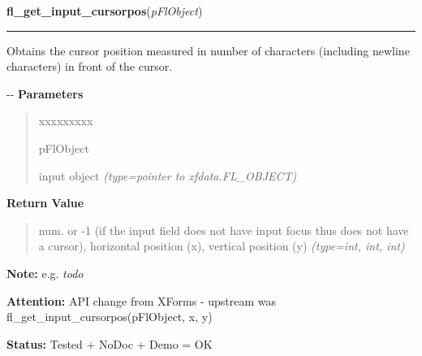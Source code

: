\hspace{.8\funcindent}\begin{boxedminipage}{\funcwidth}

    \raggedright \textbf{fl\_get\_input\_cursorpos}(\textit{pFlObject})

    \vspace{-1.5ex}

    \rule{\textwidth}{0.5\fboxrule}
\setlength{\parskip}{2ex}

Obtains the cursor position measured in number of characters (including
newline characters) in front of the cursor.

-{}-
\setlength{\parskip}{1ex}
      \textbf{Parameters}
      \vspace{-1ex}

      \begin{quote}
        \begin{Ventry}{xxxxxxxxx}

          \item[pFlObject]


input object
            {\it (type=pointer to xfdata.FL\_OBJECT)}

        \end{Ventry}

      \end{quote}

      \textbf{Return Value}
    \vspace{-1ex}

      \begin{quote}

num. or -1 (if the input field does not have input focus thus
does not have a cursor), horizontal position (x), vertical position
(y)
      {\it (type=int, int, int)}

      \end{quote}

\textbf{Note:} 
e.g. \emph{todo}


\textbf{Attention:} 
API change from XForms - upstream was
fl\_get\_input\_cursorpos(pFlObject, x, y)


\textbf{Status:} 
Tested + NoDoc + Demo = OK


    \end{boxedminipage}

    \label{xformslib:flinput:fl_set_input_cursor_visible}

    \vspace{0.5ex}

